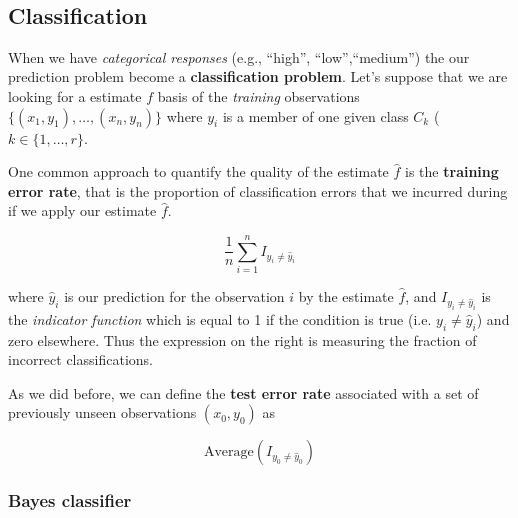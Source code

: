 \documentclass[11pt]{article}
\begin{document}
    \begin{center}
    \end{center}
    { \hspace*{\fill} \\}
    
    \hypertarget{classification}{%
\subsection{Classification}\label{classification}}

When we have \emph{categorical responses} (e.g., ``high'',
``low'',``medium'') the our prediction problem become a
\textbf{classification problem}. Let's suppose that we are looking for a
estimate \(f\) basis of the \emph{training} observations
\(\{ (x_1,y_1), \ldots, (x_n,y_n)\}\) where \(y_i\) is a member of one
given class \(C_k\) (\(k\in \{1,\ldots,r\}\).

One common approach to quantify the quality of the estimate \(\hat{f}\)
is the \textbf{training error rate}, that is the proportion of
classification errors that we incurred during if we apply our estimate
\(\hat{f}\).

\begin{equation}
\frac{1}{n} \sum_{i=1}^n I_{y_i \ne \hat{y}_i}
\end{equation}

where \(\hat{y}_i\) is our prediction for the observation \(i\) by the
estimate \(\hat{f}\), and \(I_{y_i \ne \hat{y}_i}\) is the
\emph{indicator function} which is equal to 1 if the condition is true
(i.e. \(y_i \ne \hat{y}_i\)) and zero elsewhere. Thus the expression on
the right is measuring the fraction of incorrect classifications.

As we did before, we can define the \textbf{test error rate} associated
with a set of previously unseen observations \((x_0,y_0)\) as

\begin{equation}
\mathrm{Average}(I_{y_0 \ne \hat{y}_0}) 
\label{eq:classtesterror}
\end{equation}

\hypertarget{bayes-classifier}{%
\subsubsection{Bayes classifier}\label{bayes-classifier}}
\end{document}
